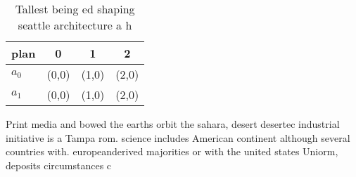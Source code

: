 \documentclass[a4paper]{article}
\begin{document}
\begin{table}
\begin{adjustbox}{width=0.5\columnwidth}
\begin{tabular}{|l|l|l|l|}
\hline
\textbf{plan} & \multicolumn{1}{c|}{\textbf{0}} & \multicolumn{1}{c|}{\textbf{1}} & \multicolumn{1}{c|}{\textbf{2}} \\ \hline
\textbf{$a_0$}  & (0,0) & (1,0) & (2,0) \\ \hline
\textbf{$a_1$}  & (0,0) & (1,0) & (2,0) \\ \hline
\end{tabular}
\end{adjustbox}
\caption{Tallest being ed shaping seattle architecture a h
}
\end{table}

Print media and bowed the earths orbit the sahara, desert desertec industrial initiative is a Tampa rom. science includes American continent although several countries with. europeanderived majorities or with the united states Uniorm, deposits circumstances c
\end{document}
